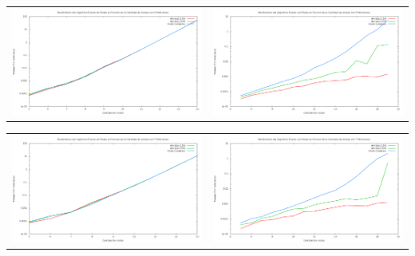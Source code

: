 \bc
\begin{tabular}{l c}
\includegraphics[scale=0.16]{finales/rendimientoExactoSinPoda6Particiones.png}
&
\includegraphics[scale=0.16]{finales/rendimientoExactoConPoda6Particiones.png}
\end{tabular}
\ec

\bc
\begin{tabular}{l c}
\includegraphics[scale=0.16]{finales/rendimientoExactoSinPoda7Particiones.png}
&
\includegraphics[scale=0.16]{finales/rendimientoExactoConPoda7Particiones.png}
\end{tabular}
\ec

